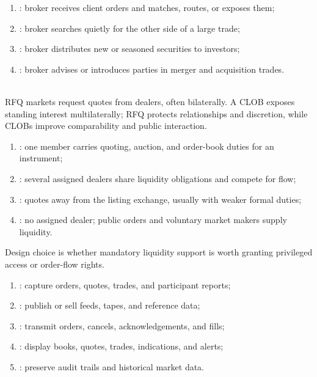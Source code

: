 \begin{taxonomy} 
\begin{enumerate}[label=\roman*.]
\setlength{\itemsep}{0pt}
\item {}: broker receives client orders and matches, routes, or exposes them;
\item {}: broker searches quietly for the other side of a large trade;
\item {}: broker distributes new or seasoned securities to investors;
\item {}: broker advises or introduces parties in merger and acquisition trades.
\end{enumerate}
\end{taxonomy}

\begin{taxonomy} \\
RFQ markets request quotes from dealers, often bilaterally. A CLOB exposes standing interest multilaterally; RFQ protects relationships and discretion, while CLOBs improve comparability and public interaction.
\end{taxonomy}

\begin{taxonomy} 
\begin{enumerate}[label=\roman*.]
\setlength{\itemsep}{0pt}
\item {}: one member carries quoting, auction, and order-book duties for an instrument;
\item {}: several assigned dealers share liquidity obligations and compete for flow;
\item {}: quotes away from the listing exchange, usually with weaker formal duties;
\item {}: no assigned dealer; public orders and voluntary market makers supply liquidity.
\end{enumerate}
Design choice is whether mandatory liquidity support is worth granting privileged access or order-flow rights.
\end{taxonomy}

\begin{taxonomy} 
\begin{enumerate}[label=\roman*.]
\setlength{\itemsep}{0pt}
\item {}: capture orders, quotes, trades, and participant reports;
\item {}: publish or sell feeds, tapes, and reference data;
\item {}: transmit orders, cancels, acknowledgements, and fills;
\item {}: display books, quotes, trades, indications, and alerts;
\item {}: preserve audit trails and historical market data.
\end{enumerate}
\end{taxonomy}

